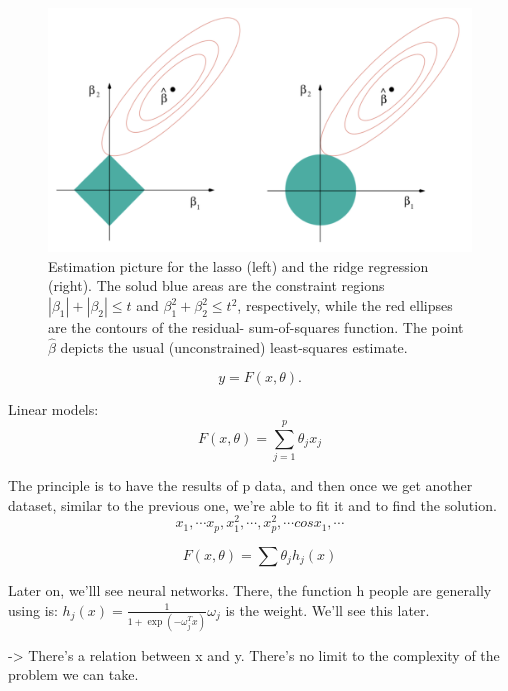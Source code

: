 \documentclass[a4paper]{tufte-book}
\begin{document}
\begin{figure}
    \includegraphics{./Figures/sparsity.png}
    \caption{Estimation picture for the lasso (left) and the ridge regression
        (right). The solud blue areas are the constraint regions
        $|\beta_1| + |\beta_2| \leq t$ and $\beta_1^2 + \beta_2^2 \leq t^2$,
        respectively, while the red ellipses are the contours of the residual-
        sum-of-squares function. The point $\hat \beta$ depicts the usual
        (unconstrained) least-squares estimate.
    }
    \label{sparsity}
\end{figure}


\begin{equation}
    y=F(x,\theta).
\end{equation}

Linear models:
\begin{equation}
F(x,\theta) = \sum_{j=1}^p \theta_j x_j
\end{equation}

The principle is to have the results of p data, and then once we get another dataset, similar to the previous one, we’re able to fit it and to find the solution.
\begin{equation}
x_1, \cdots x_p, x_1^2, \cdots, x_p^2, \cdots cos x_1, \cdots
\end{equation}

\begin{equation}
F(x, \theta) = \sum \theta_j h_j(x)
\end{equation}

Later on, we’lll see neural networks. There, the function h people are generally using is:
$h_j(x) = \frac{1}{1 + \exp (-\omega_j^T x )} \omega_j$ is the weight. We’ll see this later.

-> There’s a relation between x and y.
There’s no limit to the complexity of the problem we can take.
\end{document}

